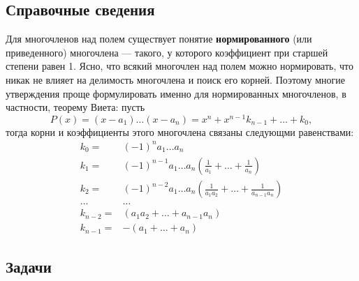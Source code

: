 \subsection*{Справочные сведения}

Для многочленов над полем существует понятие \textbf{нормированного} (или приведенного) многочлена --- такого, у которого коэффициент при старшей степени равен 1. Ясно, что всякий многочлен над полем можно нормировать, что никак не влияет на делимость многочлена и поиск его корней. Поэтому многие утверждения проще формулировать именно для нормированных многочленов, в частности, теорему Виета: пусть
$$
P(x) = (x-a_1)\dots(x-a_n)=x^n+x^{n-1}k_{n-1}+\dots+k_0,
$$
тогда корни и коэффициенты этого многочлена связаны следующми равенствами:
\begin{align*}
k_0 = & (-1)^n a_1\dots a_n \\
k_1 = & (-1)^{n-1}a_1\dots a_n\left(\frac{1}{a_1}+\dots+\frac{1}{a_n} \right) \\
k_2 = & (-1)^{n-2}a_1\dots a_n\left(\frac{1}{a_1a_2}+\dots+\frac{1}{a_{n-1}a_n} \right) \\
\dots & \dots \\
k_{n-2} = & (a_1a_2+\dots+a_{n-1}a_n) \\
k_{n-1} = & -(a_1+\dots+a_n)
\end{align*}



\subsection*{Задачи}


